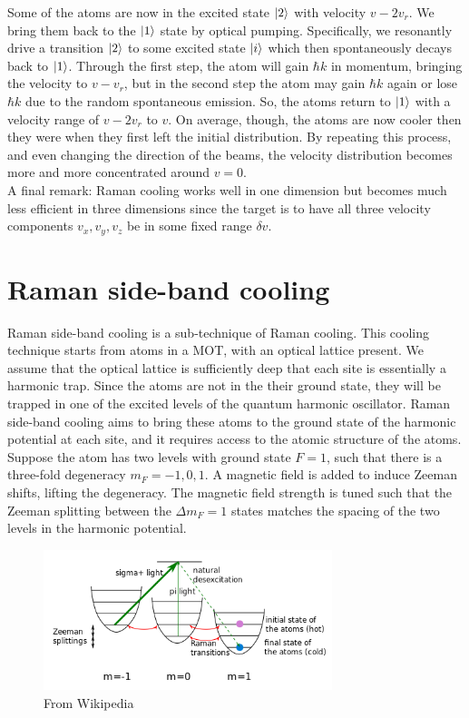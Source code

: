 \documentclass{book}
\theoremstyle{definition}
\begin{document}
Some of the atoms are now in the excited state $\ket{2}$ with velocity $v-2v_r$. We bring them back to the $\ket{1}$ state by optical pumping. Specifically, we resonantly drive a transition $\ket{2}$ to some excited state $\ket{i}$ which then spontaneously decays back to $\ket{1}$. Through the first step, the atom will gain $\hbar k$ in momentum, bringing the velocity to $v-v_r$, but in the second step the atom may gain $\hbar k$ again or lose $\hbar k$ due to the random spontaneous emission. So, the atoms return to $\ket{1}$ with a velocity range of $v-2v_r$ to $v$. On average, though, the atoms are now cooler then they were when they first left the initial distribution. By repeating this process, and even changing the direction of the beams, the velocity distribution becomes more and more concentrated around $v=0$. \\


A final remark: Raman cooling works well in one dimension but becomes much less efficient in three dimensions since the target is to have all three velocity components $v_x, v_y,v_z$ be in some fixed range $\delta v$. 



\section*{Raman side-band cooling}

Raman side-band cooling is a sub-technique of Raman cooling. This cooling technique starts from atoms in a MOT, with an optical lattice present. We assume that the optical lattice is sufficiently deep that each site is essentially a harmonic trap. Since the atoms are not in the their ground state, they will be trapped in one of the excited levels of the quantum harmonic oscillator. Raman side-band cooling aims to bring these atoms to the ground state of the harmonic potential at each site, and it requires access to the atomic structure of the atoms. \\


Suppose the atom has two levels with ground state $F=1$, such that there is a three-fold degeneracy $m_F = -1,0,1$. A magnetic field is added to induce Zeeman shifts, lifting the degeneracy. The magnetic field strength is tuned such that the Zeeman splitting between the $\Delta m_F = 1$ states matches the spacing of the two levels in the harmonic potential.


\begin{figure}[!htb]
	\centering
	\includegraphics[width=0.75\textwidth]{images/raman_sideband}
	\caption{From Wikipedia}
\end{figure}
\end{document}
